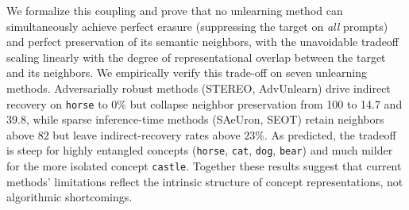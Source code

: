 We formalize this coupling and prove that no unlearning method can simultaneously achieve perfect erasure (suppressing the target on \emph{all} prompts) and perfect preservation of its semantic neighbors, with the unavoidable tradeoff scaling linearly with the degree of representational overlap between the target and its neighbors. We empirically verify this trade-off on seven unlearning methods. Adversarially robust methods (STEREO, AdvUnlearn) drive indirect recovery on \texttt{horse} to 0\% but collapse neighbor preservation from 100 to 14.7 and 39.8, while sparse inference-time methods (SAeUron, SEOT) retain neighbors above $82$ but leave indirect-recovery rates above $23$\%. As predicted, the tradeoff is steep for highly entangled concepts (\texttt{horse}, \texttt{cat}, \texttt{dog}, \texttt{bear}) and much milder for the more isolated concept \texttt{castle}. Together these results suggest that current methods' limitations reflect the intrinsic structure of concept representations, not algorithmic shortcomings.
